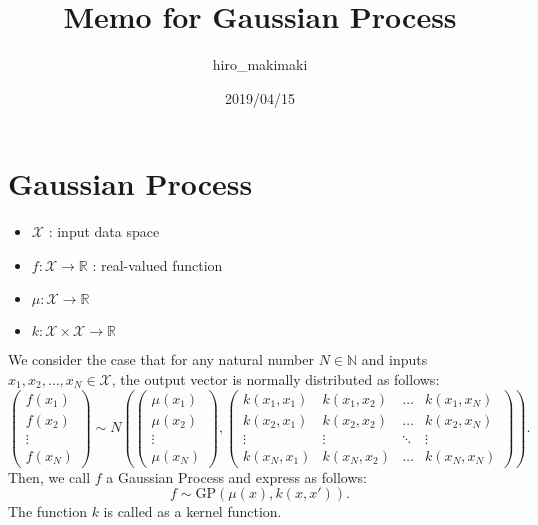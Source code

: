\documentclass{article}
\title{Memo for Gaussian Process}
\author{hiro\_makimaki}
\date{2019/04/15}
\begin{document}
\maketitle

\section{Gaussian Process}
\begin{itemize}
  \item $\mathcal{X}$ : input data space
  \item $f: \mathcal{X} \rightarrow \mathbb{R}$ : real-valued function
  \item $\mu: \mathcal{X} \rightarrow \mathbb{R}$
  \item $k: \mathcal{X} \times \mathcal{X} \rightarrow \mathbb{R}$
\end{itemize}

We consider the case that for any natural number $N \in \mathbb{N}$ and inputs $x_{1}, x_{2}, \hdots, x_{N} \in \mathcal{X}$,
the output vector is normally distributed as follows:
\[
  \left( \begin{array}{c} f(x_{1}) \\ f(x_{2}) \\ \vdots \\ f(x_{N}) \end{array} \right)
  \sim N \left(
  \left( \begin{array}{c} \mu(x_{1}) \\ \mu(x_{2}) \\ \vdots \\ \mu(x_{N}) \end{array} \right),
  \left( \begin{array}{cccc} k(x_{1}, x_{1}) & k(x_{1}, x_{2}) & \hdots & k(x_{1}, x_{N}) \\
                                     k(x_{2}, x_{1}) & k(x_{2}, x_{2}) & \hdots & k(x_{2}, x_{N}) \\
                                     \vdots & \vdots & \ddots & \vdots \\
                                     k(x_{N}, x_{1}) & k(x_{N}, x_{2}) & \hdots & k(x_{N}, x_{N}) \end{array} \right)
  \right).
\]
Then, we call $f$ a Gaussian Process and express as follows:
\[ f \sim \text{GP} ( \mu(x), k(x, x')). \]
The function $k$ is called as a kernel function.
\end{document}

